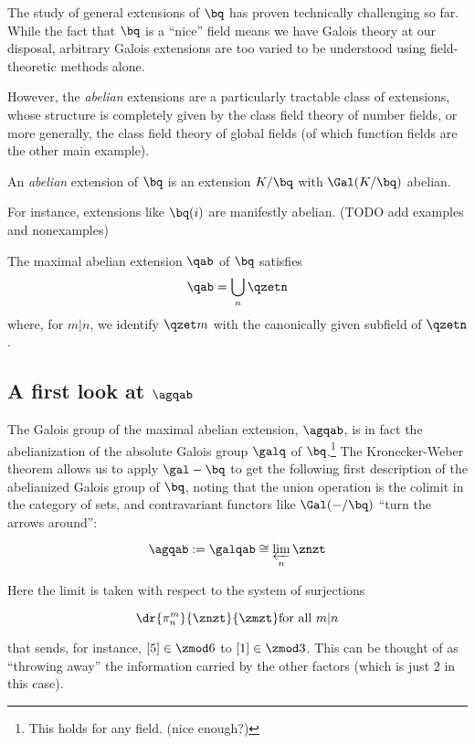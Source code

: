 The study of general extensions of $\bq$ has proven technically challenging so
far. While the fact that $\bq$ is a ``nice'' field means we have Galois theory
at our disposal, arbitrary Galois extensions are too varied to be understood
using field-theoretic methods alone.

However, the \textit{abelian} extensions are a particularly tractable class
of extensions, whose structure is completely given by the class field theory of
number fields, or more generally, the class field theory of global fields (of
which function fields are the other main example).

\begin{defn}
  An \textit{abelian} extension of $\bq$ is an extension $K/\bq$ with
  $\Gal(K/\bq)$ abelian.
\end{defn}

For instance, extensions like $\bq(i)$ are manifestly abelian. (TODO add
examples and nonexamples)

\begin{thm}
  The maximal abelian extension $\qab$ of $\bq$ satisfies
  \[ \qab = \bigcup_n \qzetn \]
  where, for $m|n$, we identify $\qzet m$ with the canonically given subfield of
  $\qzetn$.
\end{thm}

\subsection{A first look at $\agqab$}

The Galois group of the maximal abelian extension, $\agqab$, is in fact the
abelianization of the absolute Galois group $\galq$ of $\bq$.\footnote{This
  holds for any field. (nice enough?)} The
Kronecker-Weber theorem allows us to apply $\gal - \bq$ to get the following
first description of the abelianized Galois group of $\bq$, noting that the
union operation is the colimit in the category of sets, and contravariant
functors like $\Gal(-/\bq)$ ``turn the arrows around'':

\[ \agqab := \galqab \cong \varprojlim_n \znzt \]

Here the limit is taken with respect to the system of surjections

\[ \dr {\pi_ n^m} {\znzt} {\zmzt} \text{for all } m|n \]

that sends, for instance, $[5]\in{\zmod 6}$ to $[1]\in\zmod 3$. This can be
thought of as ``throwing away'' the information carried by the other factors
(which is just $2$ in this case).

